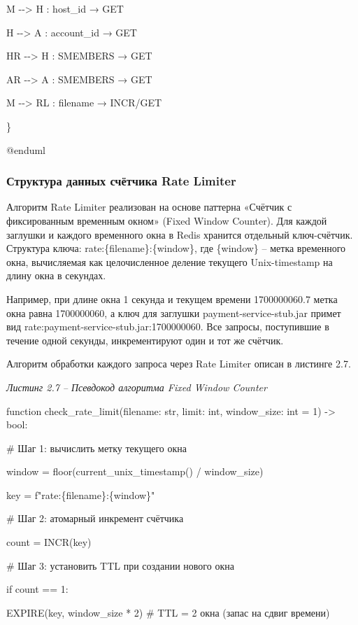 \documentclass[
]{article}
\begin{document}
M -\/-\textgreater{} H : host\_id → GET

H -\/-\textgreater{} A : account\_id → GET

HR -\/-\textgreater{} H : SMEMBERS → GET

AR -\/-\textgreater{} A : SMEMBERS → GET

M -\/-\textgreater{} RL : filename → INCR/GET

\}

@enduml

\subsubsection{Структура данных счётчика Rate
Limiter}\label{ux441ux442ux440ux443ux43aux442ux443ux440ux430-ux434ux430ux43dux43dux44bux445-ux441ux447ux451ux442ux447ux438ux43aux430-rate-limiter}

Алгоритм Rate Limiter реализован на основе паттерна «Счётчик с
фиксированным временным окном» (Fixed Window Counter). Для каждой
заглушки и каждого временного окна в Redis хранится отдельный
ключ-счётчик. Структура ключа: rate:\{filename\}:\{window\}, где
\{window\} -- метка временного окна, вычисляемая как целочисленное
деление текущего Unix-timestamp на длину окна в секундах.

Например, при длине окна 1 секунда и текущем времени 1700000060.7 метка
окна равна 1700000060, а ключ для заглушки payment-service-stub.jar
примет вид rate:payment-service-stub.jar:1700000060. Все запросы,
поступившие в течение одной секунды, инкрементируют один и тот же
счётчик.

Алгоритм обработки каждого запроса через Rate Limiter описан в листинге
2.7.

\emph{Листинг 2.7 -- Псевдокод алгоритма Fixed Window Counter}

function check\_rate\_limit(filename: str, limit: int, window\_size: int
= 1) -\textgreater{} bool:

\# Шаг 1: вычислить метку текущего окна

window = floor(current\_unix\_timestamp() / window\_size)

key = f"rate:\{filename\}:\{window\}"

\# Шаг 2: атомарный инкремент счётчика

count = INCR(key)

\# Шаг 3: установить TTL при создании нового окна

if count == 1:

EXPIRE(key, window\_size * 2) \# TTL = 2 окна (запас на сдвиг времени)
\end{document}
